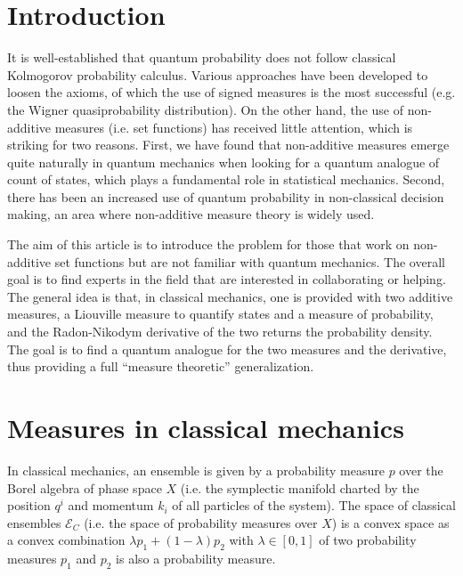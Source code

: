 \documentclass{styles/svproc}
\begin{document}
\section{Introduction}
%
It is well-established that quantum probability does not follow classical Kolmogorov probability calculus. Various approaches have been developed to loosen the axioms, of which the use of signed measures is the most successful (e.g. the Wigner quasiprobability distribution).\cite{gleason1957measures,groenewold1946principles,gudder2009quantum,hamhalter2003quantum,monchietti2023measure,moyal1949quantum,sorkin1994quantum,svozil2022extending} On the other hand, the use of non-additive measures (i.e. set functions) has received little attention, which is striking for two reasons. First, we have found that non-additive measures emerge quite naturally in quantum mechanics when looking for a quantum analogue of count of states\cite{aop-phys-QuantumRequiresNonAdditiveMeasures}, which plays a fundamental role in statistical mechanics. Second, there has been an increased use of quantum probability in non-classical decision making\cite{quantumrev2023}, an area where non-additive measure theory is widely used.

The aim of this article is to introduce the problem for those that work on non-additive set functions but are not familiar with quantum mechanics. The overall goal is to find experts in the field that are interested in collaborating or helping. The general idea is that, in classical mechanics, one is provided with two additive measures, a Liouville measure to quantify states and a measure of probability, and the Radon-Nikodym derivative of the two returns the probability density. The goal is to find a quantum analogue for the two measures and the derivative, thus providing a full ``measure theoretic'' generalization.

\section{Measures in classical mechanics}

In classical mechanics, an ensemble is given by a probability measure $p$ over the Borel algebra of phase space $X$ (i.e. the symplectic manifold charted by the position $q^i$ and momentum $k_i$ of all particles of the system). The space of classical ensembles $\mathcal{E}_C$ (i.e. the space of probability measures over $X$) is a convex space as a convex combination $\lambda p_1 + (1 - \lambda) p_2$ with $\lambda \in [0,1]$ of two probability measures $p_1$ and $p_2$ is also a probability measure.
\end{document}
